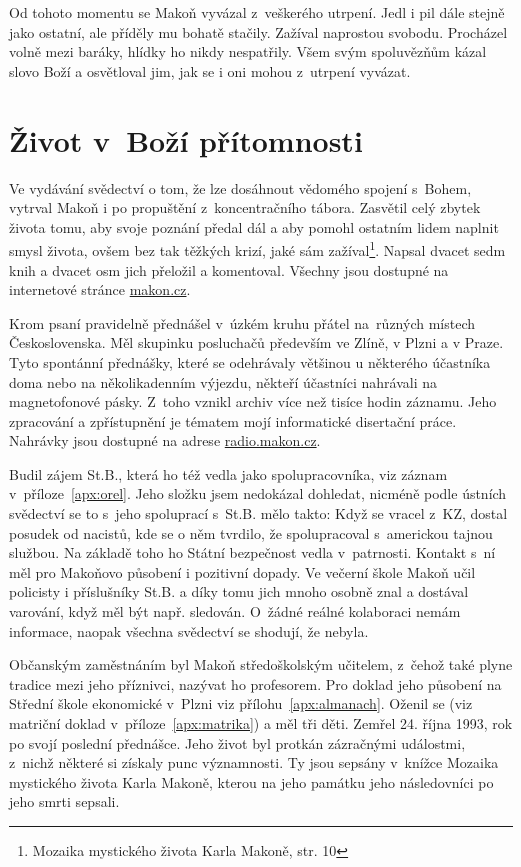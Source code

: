 Od tohoto momentu se Makoň vyvázal z~veškerého utrpení. Jedl i pil dále stejně
jako ostatní, ale příděly mu bohatě stačily. Zažíval naprostou svobodu.
Procházel volně mezi baráky, hlídky ho nikdy nespatřily. Všem svým spoluvězňům
kázal slovo Boží a osvětloval jim, jak se i oni mohou z~utrpení
vyvázat.

\section{Život v~Boží přítomnosti}

Ve vydávání svědectví o tom, že lze dosáhnout vědomého spojení s~Bohem, vytrval
Makoň i po propuštění z~koncentračního tábora. Zasvětil celý zbytek života tomu,
aby svoje poznání předal dál a aby pomohl ostatním lidem
naplnit smysl života, ovšem bez tak těžkých krizí, jaké sám
zažíval\footnote{Mozaika mystického života Karla Makoně, str. 10}. Napsal
dvacet sedm knih a dvacet osm jich přeložil a komentoval. Všechny jsou dostupné
na internetové stránce \href{http://makon.cz/}{makon.cz}.

Krom psaní pravidelně přednášel v~úzkém kruhu přátel na~různých místech
Československa. Měl skupinku posluchačů především ve Zlíně, v Plzni a v Praze.
Tyto spontánní přednášky, které se odehrávaly většinou u některého účastníka
doma nebo na několikadenním výjezdu, někteří účastníci nahrávali na
magnetofonové pásky. Z~toho vznikl archiv více než tisíce hodin záznamu. Jeho
zpracování a zpřístupnění je tématem mojí informatické disertační
práce\cite{kruuza2021iterativni}. Nahrávky jsou dostupné na adrese
\href{http://radio.makon.cz/}{radio.makon.cz}.

Budil zájem St.B., která ho též vedla jako spolupracovníka, viz záznam
v~příloze~\ref{apx:orel}. Jeho složku jsem nedokázal dohledat, nicméně podle
ústních svědectví se to s~jeho spoluprací s~St.B. mělo takto: Když se vracel
z~KZ, dostal posudek od nacistů, kde se o něm tvrdilo, že spolupracoval
s~americkou tajnou službou. Na základě toho ho Státní bezpečnost vedla
v~patrnosti. Kontakt s~ní měl pro Makoňovo působení i pozitivní dopady. Ve
večerní škole Makoň učil policisty i příslušníky St.B. a díky tomu jich mnoho
osobně znal a dostával varování, když měl být např. sledován. O~žádné reálné
kolaboraci nemám informace, naopak všechna svědectví se shodují, že nebyla.

Občanským zaměstnáním byl Makoň středoškolským učitelem, z~čehož také plyne
tradice mezi jeho příznivci, nazývat ho profesorem. Pro doklad jeho působení na
Střední škole ekonomické v~Plzni viz přílohu~\ref{apx:almanach}. Oženil se (viz matriční
doklad v~příloze~\ref{apx:matrika}) a měl tři děti.
Zemřel 24. října 1993, rok po svojí poslední přednášce. Jeho život byl protkán
zázračnými událostmi, z~nichž některé si získaly punc významnosti. Ty jsou
sepsány v~knížce Mozaika mystického života Karla Makoně\cite{kaliban2002mozaika}, kterou na
jeho památku jeho následovníci po jeho smrti sepsali.

